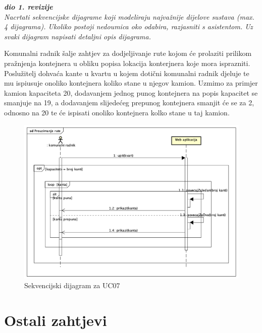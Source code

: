 				\textbf{\textit{dio 1. revizije}}\\
				
				\textit{Nacrtati sekvencijske dijagrame koji modeliraju najvažnije dijelove sustava (max. 4 dijagrama). Ukoliko postoji nedoumica oko odabira, razjasniti s asistentom. Uz svaki dijagram napisati detaljni opis dijagrama.}
				
				
				
				Komunalni radnik šalje zahtjev za dodjeljivanje rute kojom će prolaziti prilikom pražnjenja kontejnera u obliku popisa lokacija konterjnera koje mora isprazniti. Poslužitelj dohvaća kante u kvartu u kojem dotični komunalni radnik djeluje te mu ispiusuje onoliko kontejnera koliko stane u njegov kamion. Uzmimo za primjer kamion kapaciteta 20, dodavanjem jednog punog kontejnera na popis kapacitet se smanjuje na 19, a dodavanjem slijedećeg prepunog kontejnera smanjit će se za 2, odnosno na 20 te će ispisati onoliko kontejnera kolko stane u taj kamion.\\
				
				\begin{figure}[H]
					\includegraphics[scale=0.6]{figures/Preuzimanje_rute.PNG}
					\centering
					\caption{Sekvencijski dijagram za UC07}
					\label{fig:sekv-uc07}
				\end{figure}
			
				
				\eject
	
	
	
		\section{Ostali zahtjevi}\
		
